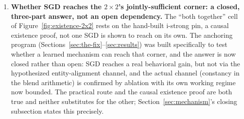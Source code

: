 \begin{enumerate}
\item \textbf{Whether SGD reaches the $2\times2$'s jointly-sufficient
corner: a closed, three-part answer, not an open dependency.} The
``both together'' cell of Figure~\ref{fig:existence-2x2} rests on the
hand-built i-strong pin, a causal existence proof, not one SGD is shown
to reach on its own. The anchoring program (Sections~\ref{sec:the-fix}--\ref{sec:results})
was built specifically to test whether a learned mechanism can reach that
corner, and the answer is now closed rather than open: SGD reaches a real
behavioral gain, but not via the hypothesized entity-alignment channel,
and the actual channel (constancy in the blend arithmetic) is confirmed
by ablation with its own working regime now bounded. The practical route
and the causal existence proof are both true and neither substitutes for
the other; Section~\ref{sec:mechanism}'s closing subsection states this
precisely.


\end{enumerate}
